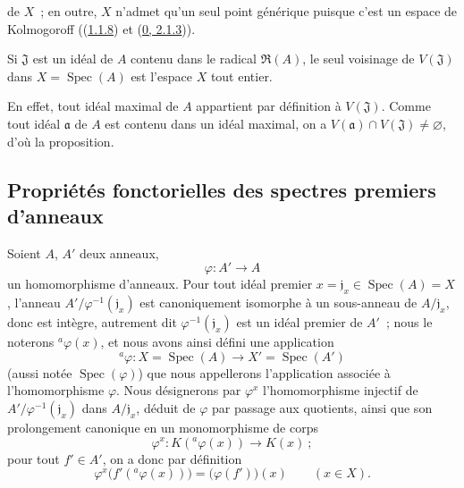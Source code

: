 de $X$~; en outre, $X$ n'admet qu'un seul point générique puisque c'est un
espace de Kolmogoroff ((\hyperref[I.1.1.8-fr]{1.1.8}) et
(\hyperref[0.2.1.3-fr]{0, 2.1.3})).

\begin{proposition}[1.1.15]
\label{I.1.1.15-fr}
Si $\mathfrak{J}$ est un idéal de $A$ contenu dans le radical
$\mathfrak{R}(A)$, le seul voisinage de $V(\mathfrak{J})$ dans
$X=\operatorname{Spec}(A)$ est l'espace $X$ tout entier.
\end{proposition}

En effet, tout idéal maximal de $A$ appartient par définition à
$V(\mathfrak{J})$. Comme tout idéal $\mathfrak{a}$ de $A$ est contenu dans un
idéal maximal, on a $V(\mathfrak{a})\cap V(\mathfrak{J})\neq\varnothing$,
d'où la proposition.

\subsection{Propriétés fonctorielles des spectres premiers d'anneaux}
\label{subsection:I.1.2-fr}

\begin{env}[1.2.1]
\label{I.1.2.1-fr}
Soient $A$, $A'$ deux anneaux,
\[
  \varphi:A'\longrightarrow A
\]
un homomorphisme d'anneaux. Pour tout idéal premier
$x=\mathfrak{j}_x\in\operatorname{Spec}(A)=X$, l'anneau
$A'/\varphi^{-1}(\mathfrak{j}_x)$ est canoniquement isomorphe à un
sous-anneau de $A/\mathfrak{j}_x$, donc est intègre, autrement dit
$\varphi^{-1}(\mathfrak{j}_x)$ est un idéal premier de $A'$~; nous le
noterons ${}^a\varphi(x)$, et nous avons ainsi défini une application
\[
  {}^a\varphi:X=\operatorname{Spec}(A)\longrightarrow
  X'=\operatorname{Spec}(A')
\]
(aussi notée $\operatorname{Spec}(\varphi)$) que nous appellerons
l'application associée à l'homomorphisme $\varphi$. Nous désignerons par
$\varphi^x$ l'homomorphisme injectif de
$A'/\varphi^{-1}(\mathfrak{j}_x)$ dans $A/\mathfrak{j}_x$, déduit de
$\varphi$ par passage aux quotients, ainsi que son prolongement canonique en
un monomorphisme de corps
\[
  \varphi^x:K({}^a\varphi(x))\longrightarrow K(x)~;
\]
pour tout $f'\in A'$, on a donc par définition
\begin{equation}
  \varphi^x\bigl(f'({}^a\varphi(x))\bigr)=\bigl(\varphi(f')\bigr)(x)
  \qquad(x\in X).
  \tag{1.2.1.1}\label{I.1.2.1.1-fr}
\end{equation}
\end{env}

